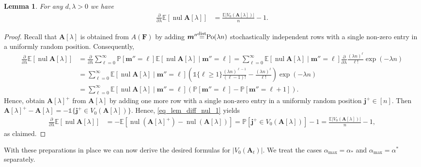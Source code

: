 \documentclass[10pt,reqno]{amsart}
\numberwithin{equation}{section}
\renewcommand{\vec}[1]{\boldsymbol{#1}}
\newcommand{\amax}{\alpha_{\max}}
\newcommand{\frz}{V_0}
\newcommand\disteq{\stacksign{dist}{=}}
\newcommand\PHI{\vec F}
\newcommand\vA{\vec A}
\newcommand\vj{\vec j}
\newcommand\vm{\vec m}
\newcommand\Erw{\mathbb{E}}
\newcommand\ex{\Erw}
\newcommand{\vecone}{\mathbb{1}}
\newcommand{\Po}{{\rm Po}}
\newcommand\bc[1]{\left({#1}\right)}
\newcommand\brk[1]{\left\lbrack{#1}\right\rbrack}
\newcommand{\stacksign}[2]{{\stackrel{\mbox{\scriptsize #1}}{#2}}}
\newcommand\pr{\mathbb{P}}
\newtheorem{lemma}[definition]{Lemma}
\DeclareMathOperator{\nul}{nul}
\def\pr{{\mathbb P}}
\begin{document}
\begin{lemma}\label{lem_diff_nul}
	For any $d,\lambda>0$ we have
	\begin{align*}
		\frac\partial{\partial\lambda}\ex[\nul \vA[\lambda]]&=\frac{\ex|\frz(\vA[\lambda])|}n-1.
	\end{align*}
\end{lemma}
\begin{proof}
	Recall that $\vA[\lambda]$ is obtained from $A(\PHI)$ by adding $\vm''\disteq\Po(\lambda n)$ stochastically independent rows with a single non-zero entry in a uniformly random position.
	Consequently,
	\begin{align}
	\frac\partial{\partial\lambda}\ex[\nul\vA[\lambda]]&=\frac\partial{\partial\lambda}\sum_{\ell=0}^\infty\pr\brk{\vm''=\ell}\ex[\nul\vA[\lambda]\mid\vm''=\ell]=\sum_{\ell=0}^\infty\ex[\nul\vA[\lambda]\mid\vm''=\ell]\frac\partial{\partial\lambda}\frac{(\lambda n)^\ell}{\ell!}\exp(-\lambda n)\nonumber\\
	&=\sum_{\ell=0}^\infty\ex[\nul\vA[\lambda]\mid\vm''=\ell]\bc{\vecone\{\ell\geq1\}\frac{(\lambda n)^{\ell-1}}{(\ell-1)!}-\frac{(\lambda n)^\ell}{\ell!}}\exp(-\lambda n)\nonumber\\
	&=\sum_{\ell=0}^\infty\ex[\nul\vA[\lambda]\mid\vm''=\ell]\bc{\pr\brk{\vm''=\ell}-\pr\brk{\vm''=\ell+1}}.
	\label{eq_lem_diff_nul_1}
\end{align}
	Hence, obtain $\vA[\lambda]^+$ from $\vA[\lambda]$ by adding one more row with a single non-zero entry in a uniformly random position $\vj^+\in[n]$.
	Then $\vA[\lambda]^+-\vA[\lambda]=-\vecone\{\vj^+\in V_0(\vA[\lambda])\}$.
	Hence, \eqref{eq_lem_diff_nul_1} yields
	\begin{align*}
		\frac\partial{\partial\lambda}\ex[\nul\vA[\lambda]]&=-\ex\brk{\nul(\vA[\lambda]^+)-\nul(\vA[\lambda])}=\pr\brk{\vec j^+\in V_0(\vA[\lambda])}-1=\frac{\ex|\frz(\vA[\lambda])|}n-1,
	\end{align*}
	as claimed.
\end{proof}

With these preparations in place we can now derive the desired formulas for $|V_0(\vA_t)|$.
We treat the cases $\amax=\alpha_*$ and $\amax=\alpha^*$ separately.
\end{document}
